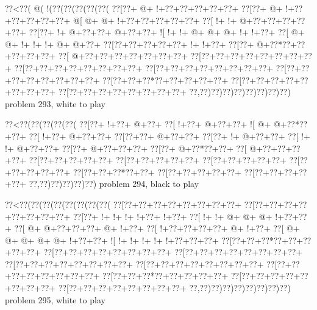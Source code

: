 \vbox{\vbox{\goo
\0??<\0??(\- @(\- !(\0??(\0??(\0??(\0??(\0??(
\0??[\0??+\- @+\- !+\0??+\0??+\0??+\0??+\0??+
\0??[\0??+\- @+\- !+\0??+\0??+\0??+\0??+\0??+
\- @[\- @+\- @+\- !+\0??+\0??+\0??+\0??+\0??+
\0??[\- !+\- !+\- @+\0??+\0??+\0??+\0??+\0??+
\0??[\0??+\- !+\- @+\0??+\0??+\- @+\0??+\0??+
\- ![\- !+\- !+\- @+\- @+\- @+\- !+\- !+\0??+
\0??[\- @+\- @+\- !+\- !+\- !+\- @+\- @+\0??+
\0??[\0??+\0??+\0??+\0??+\0??+\- !+\- !+\0??+
\0??[\0??+\- @+\0??*\0??+\0??+\0??+\0??+\0??+
\0??[\- @+\0??+\0??+\0??+\0??+\0??+\0??+\0??+
\0??[\0??+\0??+\0??+\0??+\0??+\0??+\0??+\0??+
\0??[\0??+\0??+\0??+\0??+\0??+\0??+\0??+\0??+
\0??[\0??+\0??+\0??+\0??+\0??+\0??+\0??+\0??+
\0??[\0??+\0??+\0??+\0??+\0??+\0??+\0??+\0??+
\0??[\0??+\0??+\0??*\0??+\0??+\0??+\0??+\0??+
\0??[\0??+\0??+\0??+\0??+\0??+\0??+\0??+\0??+
\0??[\0??+\0??+\0??+\0??+\0??+\0??+\0??+\0??+
\0??,\0??)\0??)\0??)\0??)\0??)\0??)\0??)\0??)
}
\hfil problem 293, white to play\hfil\break
}

\vbox{\vbox{\goo
\0??<\0??(\0??(\0??(\0??(\0??(
\0??[\0??+\- !+\0??+\- @+\0??+
\0??[\- !+\0??+\- @+\0??+\0??+
\- ![\- @+\- @+\0??*\0??+\0??+
\0??[\- !+\0??+\- @+\0??+\0??+
\0??[\0??+\0??+\- @+\0??+\0??+
\0??[\0??+\- !+\- @+\0??+\0??+
\0??[\- !+\- !+\- @+\0??+\0??+
\0??[\0??+\- @+\0??+\0??+\0??+
\0??[\0??+\- @+\0??*\0??+\0??+
\0??[\- @+\0??+\0??+\0??+\0??+
\0??[\0??+\0??+\0??+\0??+\0??+
\0??[\0??+\0??+\0??+\0??+\0??+
\0??[\0??+\0??+\0??+\0??+\0??+
\0??[\0??+\0??+\0??+\0??+\0??+
\0??[\0??+\0??+\0??*\0??+\0??+
\0??[\0??+\0??+\0??+\0??+\0??+
\0??[\0??+\0??+\0??+\0??+\0??+
\0??,\0??)\0??)\0??)\0??)\0??)
}
\hfil problem 294, black to play\hfil\break
}

\vbox{\vbox{\goo
\0??<\0??(\0??(\0??(\0??(\0??(\0??(\0??(\0??(
\0??[\0??+\0??+\0??+\0??+\0??+\0??+\0??+\0??+
\0??[\0??+\0??+\0??+\0??+\0??+\0??+\0??+\0??+
\0??[\0??+\- !+\- !+\- !+\- !+\0??+\- !+\0??+
\0??[\- !+\- !+\- @+\- @+\- @+\- !+\0??+\0??+
\0??[\- @+\- @+\0??+\0??+\0??+\- @+\- !+\0??+
\0??[\- !+\0??+\0??+\0??+\0??+\- @+\- !+\0??+
\0??[\- @+\- @+\- @+\- @+\- @+\- !+\0??+\0??+
\- ![\- !+\- !+\- !+\- !+\- !+\0??+\0??+\0??+
\0??[\0??+\0??+\0??*\0??+\0??+\0??+\0??+\0??+
\0??[\0??+\0??+\0??+\0??+\0??+\0??+\0??+\0??+
\0??[\0??+\0??+\0??+\0??+\0??+\0??+\0??+\0??+
\0??[\0??+\0??+\0??+\0??+\0??+\0??+\0??+\0??+
\0??[\0??+\0??+\0??+\0??+\0??+\0??+\0??+\0??+
\0??[\0??+\0??+\0??+\0??+\0??+\0??+\0??+\0??+
\0??[\0??+\0??+\0??*\0??+\0??+\0??+\0??+\0??+
\0??[\0??+\0??+\0??+\0??+\0??+\0??+\0??+\0??+
\0??[\0??+\0??+\0??+\0??+\0??+\0??+\0??+\0??+
\0??,\0??)\0??)\0??)\0??)\0??)\0??)\0??)\0??)
}
\hfil problem 295, white to play\hfil\break
}

